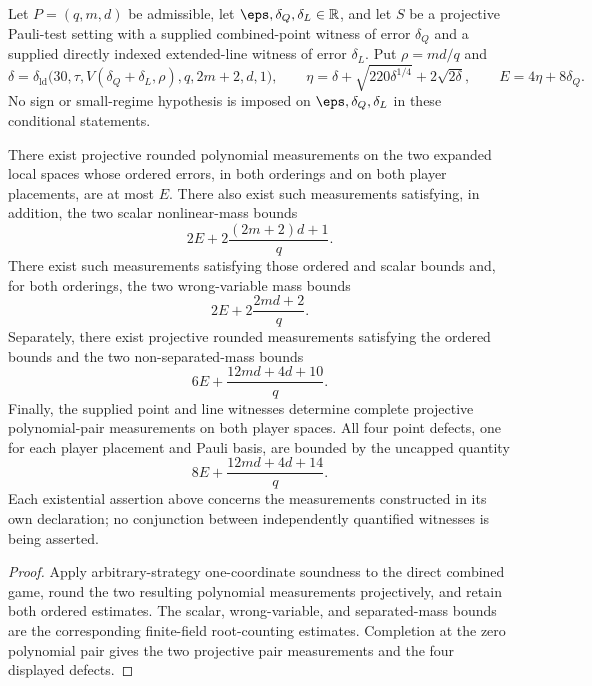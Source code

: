 \begin{theorem}
\label{thm:qld-coefficient-thirty-rounded-polynomials}
\leanok
{}
Let $P=(q,m,d)$ be admissible, let $\eps,\delta_Q,\delta_L\in\mathbb R$,
and let $S$ be a projective Pauli-test setting with a supplied combined-point
witness of error $\delta_Q$ and a supplied directly indexed extended-line
witness of error $\delta_L$. Put $\rho=md/q$ and
\[
 \delta=\delta_{\mathrm{ld}}
   \bigl(30,\tau,V(\delta_Q+\delta_L,\rho),q,2m+2,d,1\bigr),
 \qquad
 \eta=\delta+\sqrt{220\delta^{1/4}}+2\sqrt{2\delta},
 \qquad E=4\eta+8\delta_Q.
\]
No sign or small-regime hypothesis is imposed on
$\eps,\delta_Q,\delta_L$ in these conditional statements.

There exist projective rounded polynomial measurements on the two expanded
local spaces whose ordered errors, in both orderings and on both player
placements, are at most $E$. There also exist such measurements satisfying,
in addition, the two scalar nonlinear-mass bounds
\[
 2E+2\frac{(2m+2)d+1}{q}.
\]
There exist such measurements satisfying those ordered and scalar bounds and,
for both orderings, the two wrong-variable mass bounds
\[
 2E+2\frac{2md+2}{q}.
\]
Separately, there exist projective rounded measurements satisfying the ordered
bounds and the two non-separated-mass bounds
\[
 6E+\frac{12md+4d+10}{q}.
\]
Finally, the supplied point and line witnesses determine complete projective
polynomial-pair measurements on both player spaces. All four point defects,
one for each player placement and Pauli basis, are bounded by the uncapped
quantity
\[
 8E+\frac{12md+4d+14}{q}.
\]
Each existential assertion above concerns the measurements constructed in its
own declaration; no conjunction between independently quantified witnesses is
being asserted.
\end{theorem}
\begin{proof}
\leanok
{}
Apply arbitrary-strategy one-coordinate soundness to the direct combined game,
round the two resulting polynomial measurements projectively, and retain both
ordered estimates. The scalar, wrong-variable, and separated-mass bounds are
the corresponding finite-field root-counting estimates. Completion at the
zero polynomial pair gives the two projective pair measurements and the four
displayed defects.
\end{proof}

